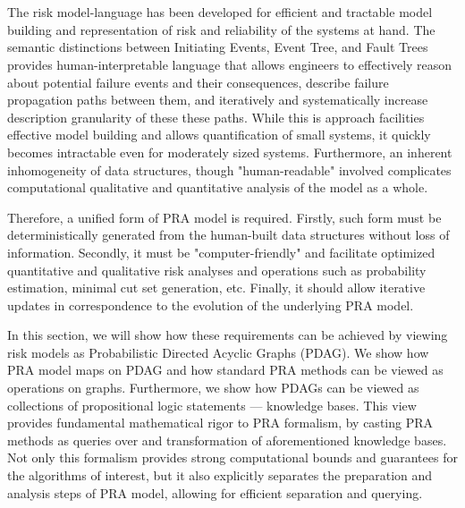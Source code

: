 \section{\color{blue}{Summary and Overview - Knowledge Compilation Map}}



The risk model-language has been developed for efficient and tractable model building and representation of risk and reliability of the systems at hand.
The semantic distinctions between Initiating Events, Event Tree, and Fault Trees provides human-interpretable language that allows engineers to effectively reason about potential failure events and their consequences, describe failure propagation paths between them, and iteratively and systematically increase description granularity of these these paths.
While this is approach facilities effective model building and allows quantification of small systems, it quickly becomes intractable even for moderately sized systems. 
Furthermore, an inherent inhomogeneity of data structures, though "human-readable" involved complicates computational qualitative and quantitative analysis of the model as a whole. 

Therefore, a unified form of PRA model is required. 
Firstly, such form must be deterministically generated from the human-built data structures without loss of information.
Secondly, it must be "computer-friendly" and facilitate optimized quantitative and qualitative risk analyses and operations such as probability estimation, minimal cut set generation, etc.
Finally, it should allow iterative updates in correspondence to the evolution of the underlying PRA model.

In this section, we will show how these requirements can be achieved by viewing risk models as Probabilistic Directed Acyclic Graphs (PDAG). We show how PRA model maps on PDAG and how standard PRA methods can be viewed as operations on graphs. 
Furthermore, we show how PDAGs can be viewed as collections of propositional logic statements --- knowledge bases.
This view provides fundamental mathematical rigor to PRA formalism, by casting PRA methods as queries over and transformation of aforementioned knowledge bases.
Not only this formalism provides strong computational bounds and guarantees for the algorithms of interest, but it also explicitly separates the preparation and analysis steps of PRA model, allowing for efficient separation and querying.

